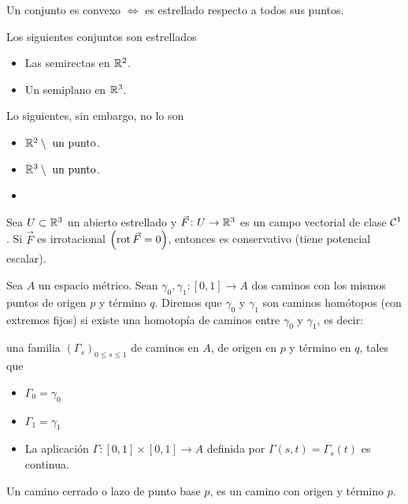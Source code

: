 \begin{obs*}
    Un conjunto es convexo $\iff$ es estrellado respecto a todos sus puntos.
\end{obs*}

\begin{example*}
    Los siguientes conjuntos son estrellados
    \begin{itemize}
        \item Las semirectas en $\mathbb{R}^2$.
        \item Un semiplano en $\mathbb{R}^3$.
    \end{itemize}
    Lo siguientes, sin embargo, no lo son
    \begin{itemize}
        \item $\mathbb{R}^2 \setminus \text{ un punto}$.
        \item $\mathbb{R}^3 \setminus \text{ un punto}$.
    \end{itemize}
\end{example*}

\begin{lema}[de Poincar\'e]
    \begin{itemize} \item[] \end{itemize}
    \noindent Sea $U \subset \mathbb{R}^3$ un abierto estrellado y $\vec{F} \colon U \to \mathbb{R}^3$ es un campo vectorial
    de clase $\mathcal{C}^1$. Si $\vec{F}$ es irrotacional $\left( \operatorname{rot} \vec{F} = 0 \right)$, entonces es conservativo
    (tiene potencial escalar).
\end{lema}

\begin{defi}
    Sea $A$ un espacio m\'etrico. Sean $\gamma_0, \gamma_1 \colon [0,1] \to A$ dos caminos con los mismos puntos
    de origen $p$ y t\'ermino $q$. Diremos que $\gamma_0$ y $\gamma_1$ son caminos homótopos (con extremos fijos)
    si existe una homotopía de caminos entre $\gamma_0$ y $\gamma_1$, es decir:
    
    una familia $\left( \Gamma_s \right)_{0 \leq s \leq 1}$ de caminos en $A$, de origen en $p$ y t\'ermino en $q$,
    tales que
    \begin{itemize}
        \item $\Gamma_0 = \gamma_0$
        \item $\Gamma_1 = \gamma_1$
        \item La aplicación $\Gamma \colon [0,1] \times [0,1] \to A$ definida por $\Gamma(s,t) = \Gamma_s(t)$ es continua.
    \end{itemize}
\end{defi}
\begin{defi*}
    Un camino cerrado o lazo de punto base $p$, es un camino con origen y t\'ermino $p$.
\end{defi*}


